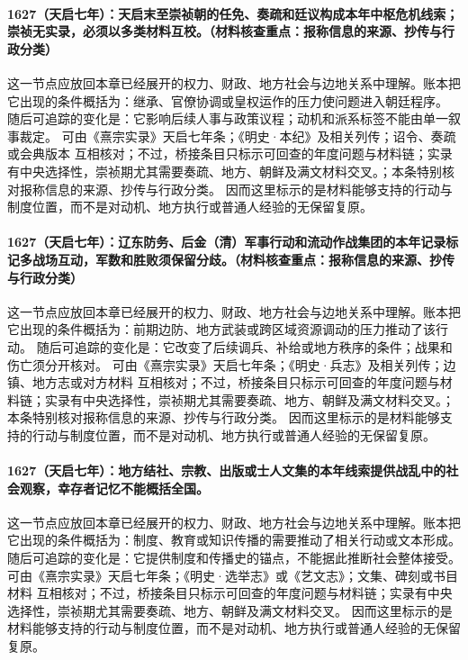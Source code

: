 \paragraph{1627（天启七年）：天启末至崇祯朝的任免、奏疏和廷议构成本年中枢危机线索；崇祯无实录，必须以多类材料互校。（材料核查重点：报称信息的来源、抄传与行政分类）} 这一节点应放回本章已经展开的权力、财政、地方社会与边地关系中理解。账本把它出现的条件概括为：继承、官僚协调或皇权运作的压力使问题进入朝廷程序。 随后可追踪的变化是：它影响后续人事与政策议程；动机和派系标签不能由单一叙事裁定。 可由《熹宗实录》天启七年条；《明史·本纪》及相关列传；诏令、奏疏或会典版本 互相核对；不过，桥接条目只标示可回查的年度问题与材料链；实录有中央选择性，崇祯期尤其需要奏疏、地方、朝鲜及满文材料交叉。；本条特别核对报称信息的来源、抄传与行政分类。 因而这里标示的是材料能够支持的行动与制度位置，而不是对动机、地方执行或普通人经验的无保留复原。

\paragraph{1627（天启七年）：辽东防务、后金（清）军事行动和流动作战集团的本年记录标记多战场互动，军数和胜败须保留分歧。（材料核查重点：报称信息的来源、抄传与行政分类）} 这一节点应放回本章已经展开的权力、财政、地方社会与边地关系中理解。账本把它出现的条件概括为：前期边防、地方武装或跨区域资源调动的压力推动了该行动。 随后可追踪的变化是：它改变了后续调兵、补给或地方秩序的条件；战果和伤亡须分开核对。 可由《熹宗实录》天启七年条；《明史·兵志》及相关列传；边镇、地方志或对方材料 互相核对；不过，桥接条目只标示可回查的年度问题与材料链；实录有中央选择性，崇祯期尤其需要奏疏、地方、朝鲜及满文材料交叉。；本条特别核对报称信息的来源、抄传与行政分类。 因而这里标示的是材料能够支持的行动与制度位置，而不是对动机、地方执行或普通人经验的无保留复原。

\paragraph{1627（天启七年）：地方结社、宗教、出版或士人文集的本年线索提供战乱中的社会观察，幸存者记忆不能概括全国。} 这一节点应放回本章已经展开的权力、财政、地方社会与边地关系中理解。账本把它出现的条件概括为：制度、教育或知识传播的需要推动了相关行动或文本形成。 随后可追踪的变化是：它提供制度和传播史的锚点，不能据此推断社会整体接受。 可由《熹宗实录》天启七年条；《明史·选举志》或《艺文志》；文集、碑刻或书目材料 互相核对；不过，桥接条目只标示可回查的年度问题与材料链；实录有中央选择性，崇祯期尤其需要奏疏、地方、朝鲜及满文材料交叉。 因而这里标示的是材料能够支持的行动与制度位置，而不是对动机、地方执行或普通人经验的无保留复原。

